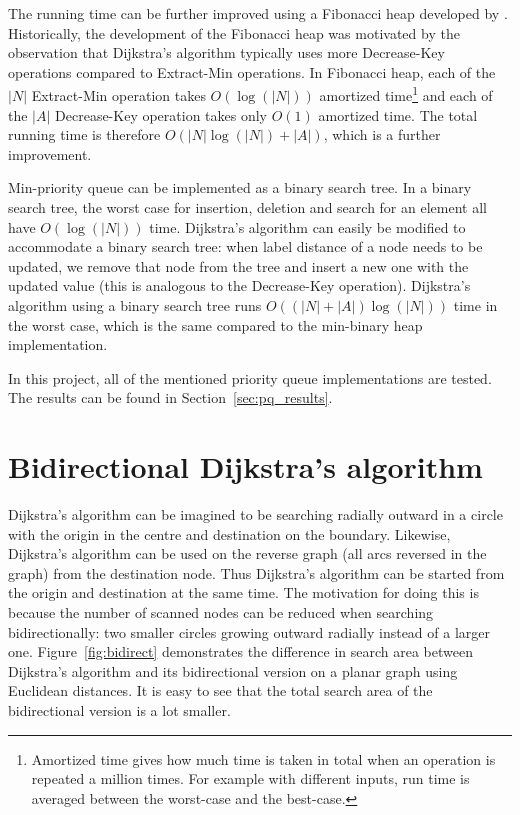 The running time can be further improved using a Fibonacci heap developed by \citet{Fredman}.
Historically, the development of the Fibonacci heap was motivated by the observation that Dijkstra's algorithm typically uses more Decrease-Key operations compared to Extract-Min operations.
In Fibonacci heap, each of the $|N|$ Extract-Min operation takes $O(\log(|N|))$ amortized time\footnote{Amortized time gives how much time is taken in total when an operation is repeated a million times. For example with different inputs, run time is averaged between the worst-case and the best-case.}
and each of the $|A|$ Decrease-Key operation takes only $O(1)$ amortized time.
The total running time is therefore $O(|N| \log(|N|)+|A|)$,
which is a further improvement.

Min-priority queue can be implemented as a binary search tree.
In a binary search tree, the worst case for insertion, deletion and search for an element all have $O(\log(|N|))$ time.
Dijkstra's algorithm can easily be modified to accommodate a binary search tree:
when label distance of a node needs to be updated,
we remove that node from the tree and insert a new one with the updated value (this is analogous to the Decrease-Key operation).
Dijkstra's algorithm using a binary search tree runs $O((|N|+|A|)\log(|N|))$ time in the worst case, which is the same compared to the min-binary heap implementation.

In this project, all of the mentioned priority queue implementations are tested.
The results can be found in Section~\ref{sec:pq_results}.

\section{Bidirectional Dijkstra's algorithm} \label{section:bidirectional}
Dijkstra's algorithm can be imagined to be searching radially outward in a circle with the origin in the centre and destination on the boundary.
Likewise, Dijkstra's algorithm can be used on the reverse graph (all arcs reversed in the graph) from the destination node.
Thus Dijkstra's algorithm can be started from the origin and destination at the same time.
The motivation for doing this is because the number of scanned nodes can be reduced when searching bidirectionally:
two smaller circles growing outward radially instead of a larger one.
Figure~\ref{fig:bidirect} demonstrates the difference in search area between Dijkstra's algorithm and its bidirectional version on a planar graph using Euclidean distances.
It is easy to see that the total search area of the bidirectional version is a lot smaller.

